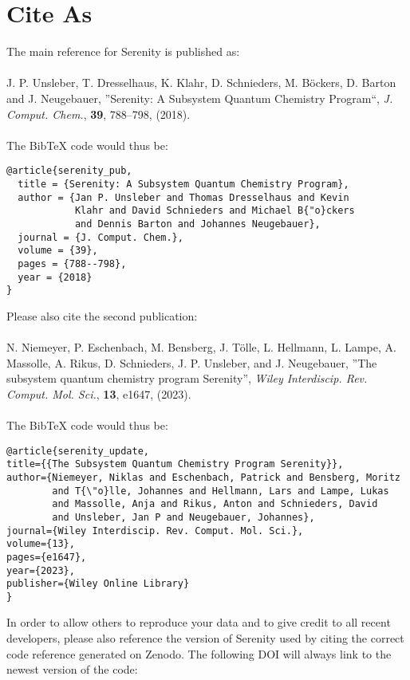 \documentclass[bibliography=totocnumbered,a4paper,10pt,oneside]{scrbook}
\begin{document}
\chapter{Cite As}
The main reference for Serenity is published as:\\
\\
J. P. Unsleber, T. Dresselhaus, K. Klahr, D. Schnieders, M. B{\"o}ckers, D. Barton and J. Neugebauer, ''Serenity: A Subsystem Quantum Chemistry Program``,
 \textit{J. Comput. Chem.}, \textbf{39}, 788--798, (2018).\\
\\
The BibTeX code would thus be:
\begin{lstlisting}
@article{serenity_pub,
  title = {Serenity: A Subsystem Quantum Chemistry Program},
  author = {Jan P. Unsleber and Thomas Dresselhaus and Kevin
            Klahr and David Schnieders and Michael B{"o}ckers
            and Dennis Barton and Johannes Neugebauer},
  journal = {J. Comput. Chem.},
  volume = {39},
  pages = {788--798},
  year = {2018}
}
\end{lstlisting}
Please also cite the second publication:\\
\\
N. Niemeyer, P. Eschenbach, M. Bensberg, J. T{\"o}lle, L. Hellmann, L. Lampe, A. Massolle, A. Rikus, D. Schnieders, J. P. Unsleber, and J. Neugebauer,
''The subsystem quantum chemistry program Serenity'',
\textit{Wiley Interdiscip. Rev. Comput. Mol. Sci.}, \textbf{13}, e1647, (2023).\\
\\
The BibTeX code would thus be:  
\begin{lstlisting}
@article{serenity_update,  
title={{The Subsystem Quantum Chemistry Program Serenity}},  
author={Niemeyer, Niklas and Eschenbach, Patrick and Bensberg, Moritz
        and T{\"o}lle, Johannes and Hellmann, Lars and Lampe, Lukas 
        and Massolle, Anja and Rikus, Anton and Schnieders, David 
        and Unsleber, Jan P and Neugebauer, Johannes},  
journal={Wiley Interdiscip. Rev. Comput. Mol. Sci.},  
volume={13},  
pages={e1647},  
year={2023},  
publisher={Wiley Online Library}
}
\end{lstlisting}
In order to allow others to reproduce your data and to give credit to all recent developers,
please also reference the version of Serenity used by citing the correct code reference
generated on Zenodo. The following DOI will always link to the newest version of the code:\\
\\
\end{document}
